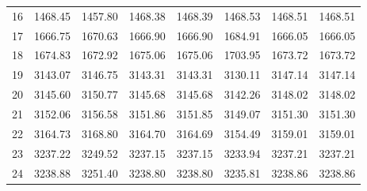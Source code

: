 \documentclass[10pt,oneside]{article}
\begin{document}
\begin{table}[h!]
\begin{tabular}{cccccccc}
16 &   1468.45 & 1457.80 & 1468.38 & 1468.39 &      1468.53 & 1468.51 & 1468.51 \\
17 &   1666.75 & 1670.63 & 1666.90 & 1666.90 &      1684.91 & 1666.05 & 1666.05 \\
18 &   1674.83 & 1672.92 & 1675.06 & 1675.06 &      1703.95 & 1673.72 & 1673.72 \\
19 &   3143.07 & 3146.75 & 3143.31 & 3143.31 &      3130.11 & 3147.14 & 3147.14 \\
20 &   3145.60 & 3150.77 & 3145.68 & 3145.68 &      3142.26 & 3148.02 & 3148.02 \\
21 &   3152.06 & 3156.58 & 3151.86 & 3151.85 &      3149.07 & 3151.30 & 3151.30 \\
22 &   3164.73 & 3168.80 & 3164.70 & 3164.69 &      3154.49 & 3159.01 & 3159.01 \\
23 &   3237.22 & 3249.52 & 3237.15 & 3237.15 &      3233.94 & 3237.21 & 3237.21 \\
24 &   3238.88 & 3251.40 & 3238.80 & 3238.80 &      3235.81 & 3238.86 & 3238.86 \\
\bottomrule
\end{tabular}
\end{table}

\clearpage
\end{document}
